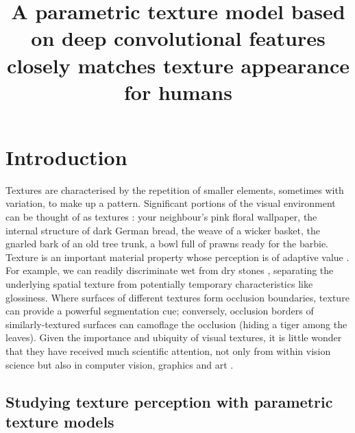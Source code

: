 \documentclass[doc, 11pt,a4paper,natbib]{apa6}\usepackage[]{graphicx}\usepackage[]{color}
\title{
A parametric texture model based on deep convolutional features closely matches texture appearance for humans
}
\begin{document}
\maketitle

\linenumbers








\section{Introduction}

Textures are characterised by the repetition of smaller elements, sometimes with variation, to make up a pattern. 
Significant portions of the visual environment can be thought of as textures \citep[``stuff'' as distinct from ``things'';][]{adelson_plenoptic_1991}: your neighbour's pink floral wallpaper, the internal structure of dark German bread, the weave of a wicker basket, the gnarled bark of an old tree trunk, a bowl full of prawns ready for the barbie. 
Texture is an important material property whose perception is of adaptive value \citep{adelson_seeing_2001, fleming_visual_2014}.  
For example, we can readily discriminate wet from dry stones \citep[e.g.][]{ho_conjoint_2008}, separating the underlying spatial texture from potentially temporary characteristics like glossiness.
Where surfaces of different textures form occlusion boundaries, texture can provide a powerful segmentation cue; conversely, occlusion borders of similarly-textured surfaces can camoflage the occlusion (hiding a tiger among the leaves).
Given the importance and ubiquity of visual textures, it is little wonder that they have received much scientific attention, not only from within vision science but also in computer vision, graphics and art \citep[see][for comprehensive recent reviews of this field]{dakin_seeing_2014,landy_texture_2013,pappas_rough_2013,rosenholtz_texture_2014}.

\subsection{Studying texture perception with parametric texture models}
\end{document}
